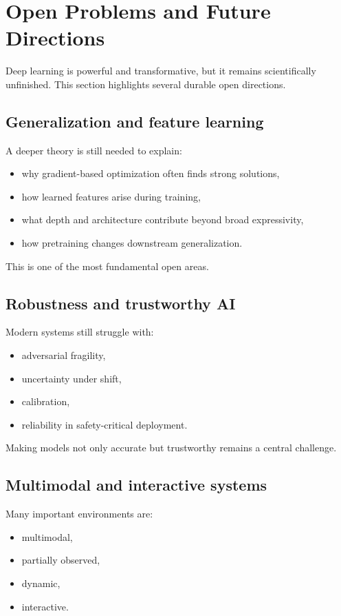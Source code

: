 \section{Open Problems and Future Directions}

Deep learning is powerful and transformative, but it remains scientifically unfinished.
This section highlights several durable open directions.

\subsection*{Generalization and feature learning}

A deeper theory is still needed to explain:
\begin{itemize}
    \item why gradient-based optimization often finds strong solutions,
    \item how learned features arise during training,
    \item what depth and architecture contribute beyond broad expressivity,
    \item how pretraining changes downstream generalization.
\end{itemize}

This is one of the most fundamental open areas.

\subsection*{Robustness and trustworthy AI}

Modern systems still struggle with:
\begin{itemize}
    \item adversarial fragility,
    \item uncertainty under shift,
    \item calibration,
    \item reliability in safety-critical deployment.
\end{itemize}

Making models not only accurate but trustworthy remains a central challenge.

\subsection*{Multimodal and interactive systems}

Many important environments are:
\begin{itemize}
    \item multimodal,
    \item partially observed,
    \item dynamic,
    \item interactive.
\end{itemize}


